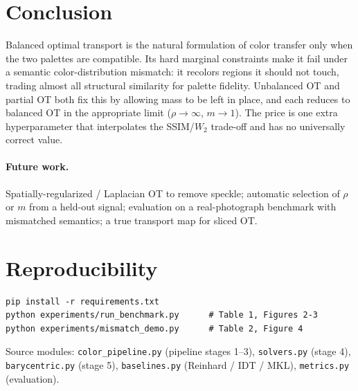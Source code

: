 \documentclass[11pt,a4paper]{article}
\newcommand{\code}[1]{\texttt{#1}}
\begin{document}
\section{Conclusion}
\label{sec:conclusion}

Balanced optimal transport is the natural formulation of color transfer only when
the two palettes are compatible. Its hard marginal constraints make it fail under
a semantic color-distribution mismatch: it recolors regions it should not touch,
trading almost all structural similarity for palette fidelity. Unbalanced OT and
partial OT both fix this by allowing mass to be left in place, and each reduces to
balanced OT in the appropriate limit ($\rho \to \infty$, $m \to 1$). The price is
one extra hyperparameter that interpolates the SSIM/$W_2$ trade-off and has no
universally correct value.

\paragraph{Future work.} Spatially-regularized / Laplacian OT to remove speckle;
automatic selection of $\rho$ or $m$ from a held-out signal; evaluation on a
real-photograph benchmark with mismatched semantics; a true transport map for
sliced OT.

\section*{Reproducibility}

\begin{verbatim}
pip install -r requirements.txt
python experiments/run_benchmark.py      # Table 1, Figures 2-3
python experiments/mismatch_demo.py      # Table 2, Figure 4
\end{verbatim}
Source modules: \code{color\_pipeline.py} (pipeline stages 1--3),
\code{solvers.py} (stage 4), \code{barycentric.py} (stage 5),
\code{baselines.py} (Reinhard / IDT / MKL), \code{metrics.py} (evaluation).
\end{document}
